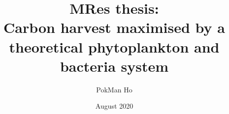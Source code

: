 \documentclass[a4paper,11pt]{article}
\title{MRes thesis:\\Carbon harvest maximised by a theoretical phytoplankton and bacteria system}
\author{PokMan Ho}
\date{August 2020}
\begin{document}
\maketitle










\nocite{*}\printbibliography
\clearpage

\end{document}
